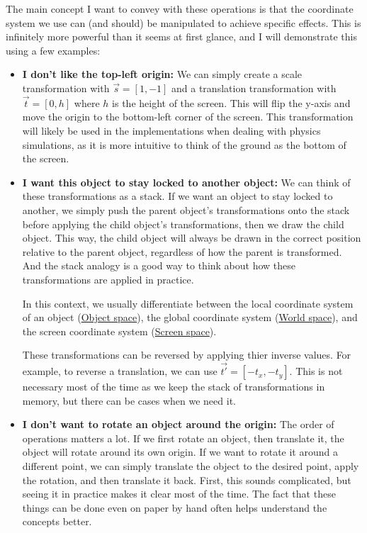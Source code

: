 \vspace{5mm}

The main concept I want to convey with these operations is that the coordinate system we use can (and should) be manipulated to achieve specific effects. This is infinitely more powerful than it seems at first glance, and I will demonstrate this using a few examples:

\begin{itemize}
    \item \textbf{I don't like the top-left origin: } We can simply create a scale transformation with \(\vec{s} = [1, -1]\) and a translation transformation with \(\vec{t} = [0, h]\) where \(h\) is the height of the screen. This will flip the y-axis and move the origin to the bottom-left corner of the screen. This transformation will likely be used in the implementations when dealing with physics simulations, as it is more intuitive to think of the ground as the bottom of the screen.

    \item \textbf{I want this object to stay locked to another object: } We can think of these transformations as a stack. If we want an object to stay locked to another, we simply push the parent object's transformations onto the stack before applying the child object's transformations, then we draw the child object. This way, the child object will always be drawn in the correct position relative to the parent object, regardless of how the parent is transformed. And the stack analogy is a good way to think about how these transformations are applied in practice. 

    \begin{Note} In this context, we usually differentiate between the local coordinate system of an object (\underline{Object space}), the global coordinate system (\underline{World space}), and the screen coordinate system (\underline{Screen space}).
    \end{Note}

    \begin{Note} These transformations can be reversed by applying thier inverse values. For example, to reverse a translation, we can use \(\vec{t'} = [-t_x, -t_y]\). This is not necessary most of the time as we keep the stack of transformations in memory, but there can be cases when we need it.
    \end{Note}

    \item \textbf{I don't want to rotate an object around the origin: } The order of operations matters a lot. If we first rotate an object, then translate it, the object will rotate around its own origin. If we want to rotate it around a different point, we can simply translate the object to the desired point, apply the rotation, and then translate it back. First, this sounds complicated, but seeing it in practice makes it clear most of the time. The fact that these things can be done even on paper by hand often helps understand the concepts better.
\end{itemize}

